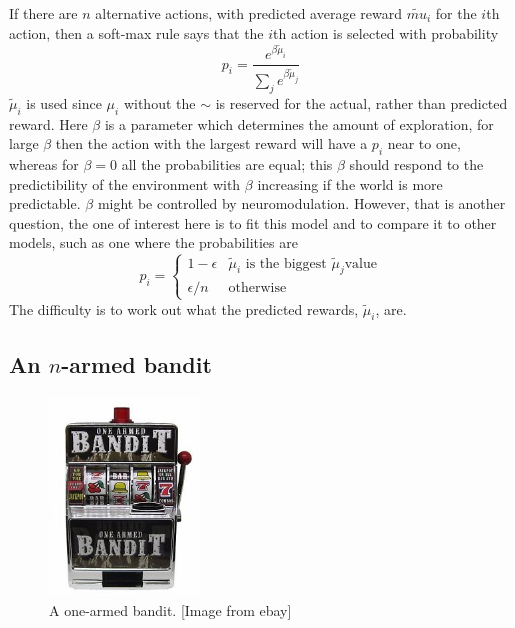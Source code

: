 \documentclass[12pt]{article}
\begin{document}
If there are $n$ alternative actions, with predicted average reward $\tilde{mu}_i$ for
the $i$th action, then a soft-max rule says that the $i$th action is
selected with probability
\begin{equation}
p_i=\frac{e^{\beta \tilde{\mu}_i}}{\sum_j e^{\beta \tilde{\mu}_j}}
\end{equation}
$\tilde{\mu}_i$ is used since $\mu_i$ without the $\sim$ is reserved
for the actual, rather than predicted reward.  Here $\beta$ is a
parameter which determines the amount of exploration, for large
$\beta$ then the action with the largest reward will have a $p_i$ near
to one, whereas for $\beta=0$ all the probabilities are equal; this
$\beta$ should respond to the predictibility of the environment with
$\beta$ increasing if the world is more predictable. $\beta$ might be
controlled by neuromodulation. However, that is another question, the
one of interest here is to fit this model and to compare it to other
models, such as one where the probabilities are
\begin{equation}
p_i=\left\{\begin{array}{ll}1-\epsilon&\tilde{\mu}_i\mbox{ is the
  biggest }\tilde{\mu}_j\mbox{
  value}\\\epsilon/n&\mbox{otherwise}\end{array}\right.
\end{equation}
The difficulty is to work out what the predicted rewards,
$\tilde{\mu}_i$, are.

\subsection*{An $n$-armed bandit}

\begin{figure}[htb]
\begin{center}
\includegraphics[width=4cm]{fig_one_armed.jpg}
\end{center}
\caption{A one-armed bandit. [Image from ebay]\label{fig_one_armed}}
\end{figure}
\end{document}
